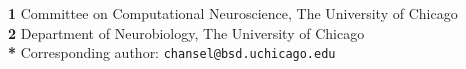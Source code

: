 \begin{flushleft}
    {\textbf{1}} Committee on Computational Neuroscience, The University of Chicago \\
    {\textbf{2}} Department of Neurobiology, The University of Chicago \\
    {\textbf{*}} Corresponding author: \texttt{chansel@bsd.uchicago.edu}
\end{flushleft}

